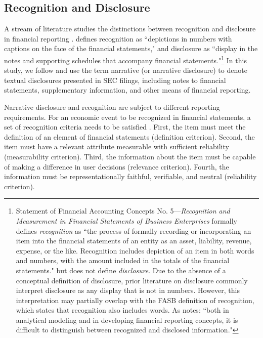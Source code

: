 \documentclass[letterpaper,12pt]{article}
\begin{document}
\begin{spacing}{1.5}
\subsection{Recognition and Disclosure}
\noindent A stream of literature studies the distinctions between recognition and disclosure in financial reporting \cite{aboodyRecognitionDisclosureOil1996, barthMarketEffectsRecognition2003, schipperRequiredDisclosuresFinancial2007}.  defines recognition as ``depictions in numbers with captions on the face of the financial statements," and disclosure as ``display in the notes and supporting schedules that accompany financial statements."\footnote{Statement of Financial Accounting Concepts No. 5---\textit{Recognition and Measurement in Financial Statements of Business Enterprises} formally defines \textit{recognition} as ``the process of formally recording or incorporating an item into the financial statements of an entity as an asset, liability, revenue, expense, or the like. Recognition includes depiction of an item in both words and numbers, with the amount included in the totals of the financial statements." \cite[par. 6]{fasbStatementFinancialAccounting1984} but does not define \textit{disclosure}. Due to the absence of a conceptual definition of disclosure, prior literature on disclosure commonly interpret disclosure as any display that is not in numbers. However, this interpretation may partially overlap with the FASB definition of recognition, which states that recognition also includes words. As  notes: ``both in analytical modeling and in developing financial reporting concepts, it is difficult to distinguish between recognized and disclosed information."} In this study, we follow  and use the term narrative (or narrative disclosure) to denote textual disclosures presented in SEC filings, including notes to financial statements, supplementary information, and other means of financial reporting.

Narrative disclosure and recognition are subject to different reporting requirements. For an economic event to be recognized in financial statements, a set of recognition criteria needs to be satisfied \cite{fasbStatementFinancialAccounting1984}. First, the item must meet the definition of an element of financial statements (definition criterion). Second, the item must have a relevant attribute measurable with sufficient reliability (measurability criterion). Third, the information about the item must be capable of making a difference in user decisions (relevance criterion). Fourth, the information must be representationally faithful, verifiable, and neutral (reliability criterion). 


\end{spacing}
\end{document}
